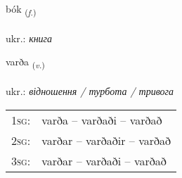 \documentclass[frontgrid, backgrid]{flacards}\usepackage[]{graphicx}\usepackage[]{xcolor}
\begin{document}
\renewcommand{\blhead}{\vskip5pt {\small\bfseries\footnotesize Nafnorð | іменник }}
\renewcommand{\bcfoot}{\vskip5pt \hspace{2pt}{\small\bfseries\footnotesize 1K}}


{bók \small{\textsubscript{(\textit{f.})}} \\[1ex] %
\textphonetic{[pouːk]} \\
ukr.: \emph{книга} \\  [2ex]
\renewcommand*{\arraystretch}{0.8}
}

\renewcommand{\flhead}{\vskip5pt \fboxsep=0pt {\small\bfseries\footnotesize Sagnorð | дієслово}}
\renewcommand{\fcfoot}{\vskip5pt \fboxsep=0pt \hspace{2pt}{\small\bfseries\footnotesize 1K}}

\renewcommand{\blhead}{\vskip5pt {\small\bfseries\footnotesize Sagnorð | дієслово }}
\renewcommand{\bcfoot}{\vskip5pt \hspace{2pt}{\small\bfseries\footnotesize 1K}}


{varða \small{\textsubscript{(\textit{v.})}} \\[1ex] %
\textphonetic{[varða]} \\
ukr.: \emph{відношення / турбота / тривога} \\  [2ex]
\renewcommand*{\arraystretch}{0.8}
\begin{tabular}{p{1cm}l}
\textsc{1sg}: & varða -- varðaði -- varðað \\ 
\textsc{2sg}: & varðar -- varðaðir -- varðað \\ 
\textsc{3sg}: & varðar -- varðaði -- varðað \\ 
\end{tabular}
}

\end{document}
